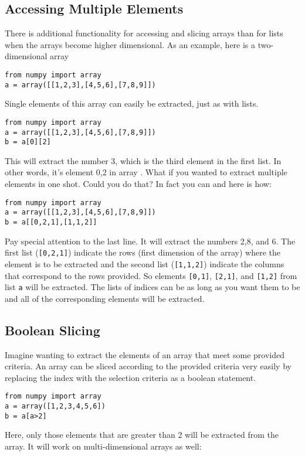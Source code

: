 \subsection*{Accessing Multiple Elements}
There is additional functionality for accessing and slicing arrays
than for lists when the arrays become higher dimensional.  As an
example, here is a two-dimensional array
\begin{Verbatim}
from numpy import array
a = array([[1,2,3],[4,5,6],[7,8,9]])
\end{Verbatim}
Single elements of this array can easily be extracted, just as with
lists.
\begin{Verbatim}
from numpy import array
a = array([[1,2,3],[4,5,6],[7,8,9]])
b = a[0][2]
\end{Verbatim}
This will extract the number 3, which is the third element in the
first list.  In other words, it's element 0,2 in array .
What if you wanted to extract multiple elements in one shot.  Could
you do that?  In fact you can and here is how:
\begin{Verbatim}
from numpy import array
a = array([[1,2,3],[4,5,6],[7,8,9]])
b = a[[0,2,1],[1,1,2]]
\end{Verbatim}
Pay special attention to the last line.  It will extract the numbers
2,8, and 6.  The first list (\texttt{[0,2,1]}) indicate the rows
(first dimension of the array) where the element is to be extracted
and the second list (\texttt{[1,1,2]}) indicate the columns that
correspond to the rows provided.  So elements \texttt{[0,1]},
\texttt{[2,1]}, and \texttt{[1,2]} from list \texttt{a} will be
extracted.  The lists of indices can be as long as you want them to be
and all of the corresponding elements will be extracted.
\subsection*{Boolean Slicing}
Imagine wanting to extract the elements of an array that meet some
provided criteria.  An array can be sliced according to the provided
criteria very easily by replacing the index with the selection
criteria as a boolean statement.
\begin{Verbatim}
from numpy import array
a = array([1,2,3,4,5,6])
b = a[a>2]
\end{Verbatim}
Here, only those elements that are greater than 2 will be extracted
from the array.  It will work on multi-dimensional arrays as well:

